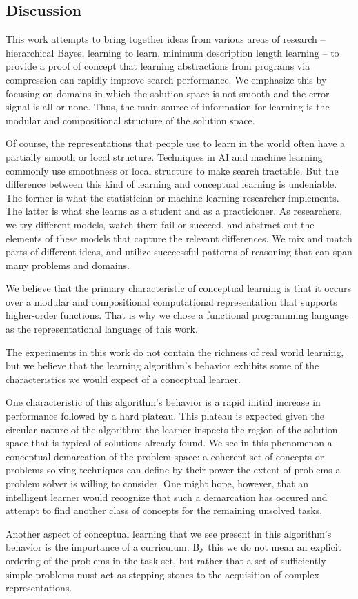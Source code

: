 \documentclass{article}
\begin{document}
\subsection{Discussion}
This work attempts to bring together ideas from various areas of
research -- hierarchical Bayes, learning to learn, minimum description
length learning -- to provide a proof of concept that learning
abstractions from programs via compression can rapidly improve search
performance. We emphasize this by focusing on domains in which the
solution space is not smooth and the error signal is all or
none. Thus, the main source of information for learning is the modular
and compositional structure of the solution space.

Of course, the representations that people use to learn in the world
often have a partially smooth or local structure. Techniques in AI and
machine learning commonly use smoothness or local structure to make
search tractable. But the difference between this kind of learning and
conceptual learning is undeniable. The former is what the statistician
or machine learning researcher implements. The latter is what she
learns as a student and as a practicioner. As researchers, we try
different models, watch them fail or succeed, and abstract out the
elements of these models that capture the relevant differences. We mix
and match parts of different ideas, and utilize succcessful patterns
of reasoning that can span many problems and domains. 

We believe that the primary characteristic of conceptual learning is
that it occurs over a modular and compositional computational
representation that supports higher-order functions. That is why we
chose a functional programming language as the representational
language of this work.

The experiments in this work do not contain the richness of real world
learning, but we believe that the learning algorithm's behavior
exhibits some of the characteristics we would expect of a conceptual
learner. 

One characteristic of this algorithm's behavior is a rapid initial
increase in performance followed by a hard plateau. This plateau is
expected given the circular nature of the algorithm: the learner
inspects the region of the solution space that is typical of solutions
already found. We see in this phenomenon a conceptual demarcation of
the problem space: a coherent set of concepts or problems solving
techniques can define by their power the extent of problems a problem
solver is willing to consider. One might hope, however, that an
intelligent learner would recognize that such a demarcation has
occured and attempt to find another class of concepts for the
remaining unsolved tasks.

Another aspect of conceptual learning that we see present in this
algorithm's behavior is the importance of a curriculum. By this we do
not mean an explicit ordering of the problems in the task set, but
rather that a set of sufficiently simple problems must act as stepping
stones to the acquisition of complex representations. 






\nocite{*}
\end{document}
